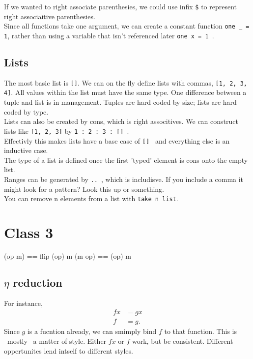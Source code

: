 \documentclass[12pt]{article}
\begin{document}
If we wanted to right associate parenthesies, we could use infix {\tt \$} to represent right associaitive parenthesies. \\ 
Since all functions take one argument, we can create a constant function {\tt one \_ = 1}, rather than using a variable that isn't referenced later {\tt one x = 1 }. \\

\subsection{Lists}
The most basic list is {\tt []}. We can on the fly define lists with commas, {\tt [1, 2, 3, 4]}. All values within the list must have the same type. One difference between a tuple and list is in management. Tuples are hard coded by size; lists are hard coded by type.\\

Lists can also be created by cons, which is right associtives. We can construct lists like {\tt [1, 2, 3]} by {\tt 1 : 2 : 3 : [] }. \\
Effectivly this makes lists have a base case of {\tt [] } and everything else is an inductive case.\\

The type of a list is defined once the first 'typed' element is cons onto the empty list.\\

Ranges can be generated by {\tt .. }, which is includisve. If you include a comma it might look for a pattern? Look this up or something.  \\

You can remove n elements from a list with {\tt take n list}. 




\section{Class 3}
(op m) == flip (op) m
(m op) == (op) m

\subsection{$\eta$ reduction}
For instance,
\begin{equation*}
  \begin{aligned}
    f x &= g x\\
    f &= g.
  \end{aligned}
\end{equation*}
Since $g$ is a fucntion already, we can smimply bind $f$ to that function. This is ~mostly~ a matter of style. Either $f x$ or $f$ work, but be consistent. Different oppertunites lend intself to different styles.
\end{document}
